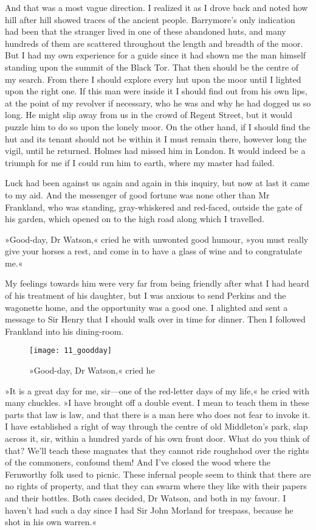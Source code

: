 And that was a most vague direction. I realized it as I drove back and noted how hill after hill showed traces of the ancient people. Barrymore's only indication had been that the stranger lived in one of these abandoned huts, and many hundreds of them are scattered throughout the length and breadth of the moor. But I had my own experience for a guide since it had shown me the man himself standing upon the summit of the Black Tor. That then should be the centre of my search. From there I should explore every hut upon the moor until I lighted upon the right one. If this man were inside it I should find out from his own lips, at the point of my revolver if necessary, who he was and why he had dogged us so long. He might slip away from us in the crowd of Regent Street, but it would puzzle him to do so upon the lonely moor. On the other hand, if I should find the hut and its tenant should not be within it I must remain there, however long the vigil, until he returned. Holmes had missed him in London. It would indeed be a triumph for me if I could run him to earth, where my master had failed.

Luck had been against us again and again in this inquiry, but now at last it came to my aid. And the messenger of good fortune was none other than Mr Frankland, who was standing, gray-whiskered and red-faced, outside the gate of his garden, which opened on to the high road along which I travelled.

»Good-day, Dr Watson,« cried he with unwonted good hum\-our, »you must really give your horses a rest, and come in to have a glass of wine and to congratulate me.«

My feelings towards him were very far from being friendly after what I had heard of his treatment of his daughter, but I was anxious to send Perkins and the wagonette home, and the opportunity was a good one. I alighted and sent a message to Sir Henry that I should walk over in time for dinner. Then I followed Frankland into his dining-room.

\begin{figure}[tbh]
\centering
\texttt{[image: 11\_goodday]}
\caption{»Good-day, Dr Watson,« cried he}
\end{figure}

»It is a great day for me, sir—one of the red-letter days of my life,« he cried with many chuckles. »I have brought off a double event. I mean to teach them in these parts that law is law, and that there is a man here who does not fear to invoke it. I have established a right of way through the centre of old Middleton's park, slap across it, sir, within a hundred yards of his own front door. What do you think of that? We'll teach these magnates that they cannot ride roughshod over the rights of the commoners, confound them! And I've closed the wood where the Fernworthy folk used to picnic. These infernal people seem to think that there are no rights of property, and that they can swarm where they like with their papers and their bottles. Both cases decided, Dr Watson, and both in my favour. I haven't had such a day since I had Sir John Morland for trespass, because he shot in his own warren.«

